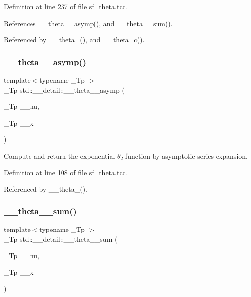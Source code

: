 Definition at line 237 of file sf\+\_\+theta.\+tcc.



References \+\_\+\+\_\+theta\+\_\+\_\+asymp(), and \+\_\+\+\_\+theta\+\_\+\_\+sum().



Referenced by \+\_\+\+\_\+theta\+\_(), and \+\_\+\+\_\+theta\+\_\+c().

\mbox{\label{namespacestd_1_1____detail_ac7207ce23916e29df96b3b2159b55150}} 
\subsubsection{\texorpdfstring{\+\_\+\+\_\+theta\+\_\+\_\+asymp()}{\_\_theta\_2\_asymp()}}
{\footnotesize\ttfamily template$<$typename \+\_\+\+Tp $>$ \\
\+\_\+\+Tp std\+::\+\_\+\+\_\+detail\+::\+\_\+\+\_\+theta\+\_\+\_\+asymp (\begin{DoxyParamCaption}\item[{\+\_\+\+Tp}]{\+\_\+\+\_\+nu,  }\item[{\+\_\+\+Tp}]{\+\_\+\+\_\+x }\end{DoxyParamCaption})}

Compute and return the exponential $ \theta_2 $ function by asymptotic series expansion. 

Definition at line 108 of file sf\+\_\+theta.\+tcc.



Referenced by \+\_\+\+\_\+theta\+\_().

\mbox{\label{namespacestd_1_1____detail_af434f6a07d92577f40f352aa3d44483c}} 
\subsubsection{\texorpdfstring{\+\_\+\+\_\+theta\+\_\+\_\+sum()}{\_\_theta\_2\_sum()}}
{\footnotesize\ttfamily template$<$typename \+\_\+\+Tp $>$ \\
\+\_\+\+Tp std\+::\+\_\+\+\_\+detail\+::\+\_\+\+\_\+theta\+\_\+\_\+sum (\begin{DoxyParamCaption}\item[{\+\_\+\+Tp}]{\+\_\+\+\_\+nu,  }\item[{\+\_\+\+Tp}]{\+\_\+\+\_\+x }\end{DoxyParamCaption})}


